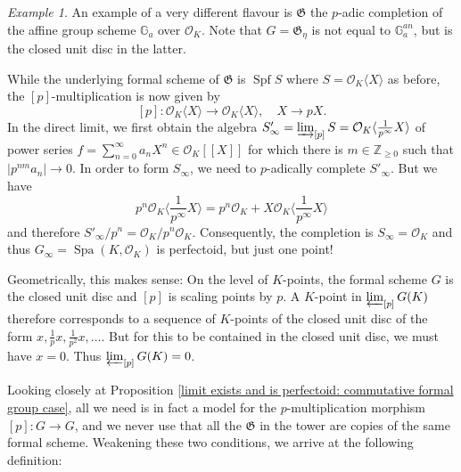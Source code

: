 \documentclass[10pt,oneside]{amsart}
\theoremstyle{definition}
\theoremstyle{remark}
\newtheorem*{example}{Example}
\begin{document}
	\begin{example}
		An example of a very different flavour is $\mathfrak G$ the $p$-adic completion of the affine group scheme $\mathbb G_a$ over $\mathcal O_K$. Note that $G=\mathfrak G_\eta$ is not equal to $\mathbb G_a^{an}$, but is the closed unit disc in the latter.
		
		While the underlying formal scheme of $\mathfrak G$ is $\operatorname {Spf} S$ where $S=\mathcal O_K\langle X \rangle$ as before, the $[p]$-multiplication is now given by
		\[[p]:\mathcal O_K\langle X \rangle\rightarrow  \mathcal O_K\langle X \rangle, \quad X\rightarrow pX.\]
		In the direct limit, we first obtain the algebra $S'_\infty = \varinjlim_{[p]} S = \mathcal O_K\langle \frac{1}{p^\infty}X \rangle$ of power series $f=\sum_{n=0}^\infty  a_nX^n\in \mathcal O_K[[X]]$ for which there is $m\in \mathbb Z_{\geq 0}$ such that $|p^{nm}a_n|\to 0$. In order to form $S_\infty$, we need to $p$-adically complete $S'_\infty$. But we have 
		\[p^n\mathcal O_K\langle \frac{1}{p^\infty}X \rangle = p^n\mathcal O_K + X \mathcal O_K\langle \frac{1}{p^\infty}X \rangle\]
		and therefore $S'_\infty/p^n=\mathcal O_K/p^n\mathcal O_K$. Consequently, the completion is $S_\infty = \mathcal O_K$ and thus $G_\infty = \operatorname{Spa}(K,\mathcal O_K)$ is perfectoid, but just one point!
		
		Geometrically, this makes sense: On the level of $K$-points, the formal scheme $G$ is the closed unit disc and $[p]$ is scaling points by $p$. A $K$-point in $\varprojlim_{[p]} G(K)$ therefore corresponds to a sequence of $K$-points of the closed unit disc of the form $x,\frac{1}{p}x,\frac{1}{p^2}x,\dots$. But for this to be contained in the closed unit disc, we must have $x=0$. Thus $\varprojlim_{[p]} G(K)=0$.
		
	\end{example}
	
	Looking closely at  Proposition \ref{limit exists and is perfectoid: commutative formal group case}, all we need is in fact a model for the $p$-multiplication morphism $[p]:G\rightarrow G$, and we never use that all the $\mathfrak G$ in the tower are copies of the same formal scheme. Weakening these two conditions, we arrive at the following definition:
	
\end{document}
